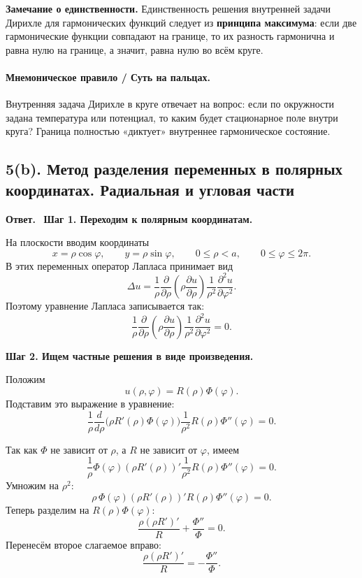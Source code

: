 \documentclass[a4paper,12pt]{article}
\newcommand{\Answer}{\textbf{Ответ.}\ }
\begin{document}
\textbf{Замечание о единственности.}
Единственность решения внутренней задачи Дирихле для гармонических функций следует из \textbf{принципа максимума}: если две гармонические функции совпадают на границе, то их разность гармонична и равна нулю на границе, а значит, равна нулю во всём круге.

\paragraph{Мнемоническое правило / Суть на пальцах.}
Внутренняя задача Дирихле в круге отвечает на вопрос: если по окружности задана температура или потенциал, то каким будет стационарное поле внутри круга? Граница полностью «диктует» внутреннее гармоническое состояние.

\subsection*{5(b). Метод разделения переменных в полярных координатах. Радиальная и угловая части}

\Answer
\textbf{Шаг 1. Переходим к полярным координатам.}

На плоскости вводим координаты
\[
x=\rho\cos\varphi,
\qquad
y=\rho\sin\varphi,
\qquad
0\le \rho<a,
\qquad
0\le \varphi\le 2\pi.
\]
В этих переменных оператор Лапласа принимает вид
\[
\Delta u
=
\frac{1}{\rho}\frac{\partial}{\partial\rho}
\left(
\rho\frac{\partial u}{\partial\rho}
\right)
\frac{1}{\rho^2}\frac{\partial^2u}{\partial\varphi^2}.
\]
Поэтому уравнение Лапласа записывается так:
\[
\frac{1}{\rho}\frac{\partial}{\partial\rho}
\left(
\rho\frac{\partial u}{\partial\rho}
\right)
\frac{1}{\rho^2}\frac{\partial^2u}{\partial\varphi^2}=0.
\]

\textbf{Шаг 2. Ищем частные решения в виде произведения.}

Положим
\[
u(\rho,\varphi)=R(\rho)\Phi(\varphi).
\]
Подставим это выражение в уравнение:
\[
\frac{1}{\rho}\frac{d}{d\rho}\bigl(\rho R'(\rho)\Phi(\varphi)\bigr)
\frac{1}{\rho^2}R(\rho)\Phi''(\varphi)=0.
\]

Так как $\Phi$ не зависит от $\rho$, а $R$ не зависит от $\varphi$, имеем
\[
\frac{1}{\rho}\Phi(\varphi)(\rho R'(\rho))'
\frac{1}{\rho^2}R(\rho)\Phi''(\varphi)=0.
\]
Умножим на $\rho^2$:
\[
\rho\,\Phi(\varphi)(\rho R'(\rho))'
R(\rho)\Phi''(\varphi)=0.
\]
Теперь разделим на $R(\rho)\Phi(\varphi)$:
\[
\frac{\rho(\rho R')'}{R}+\frac{\Phi''}{\Phi}=0.
\]
Перенесём второе слагаемое вправо:
\[
\frac{\rho(\rho R')'}{R}
=
-\frac{\Phi''}{\Phi}.
\]
\end{document}
